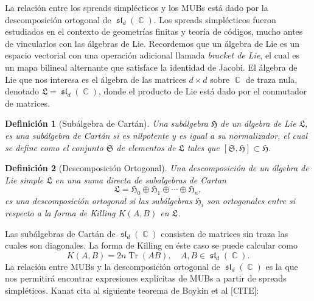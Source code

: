 \documentclass[a4paper]{report}
\DeclareMathOperator{\C}{\mathbb{C}}
\DeclareMathOperator{\Tr}{Tr}
\DeclareMathOperator{\Sl}{\mathfrak{sl}}
\newtheorem{definition}{Definición}
\begin{document}
  La relación entre los spreads simplécticos y los MUBs está
  dado por la descomposición ortogonal de $\Sl_d(\C)$. Los
  spreads simplécticos fueron estudiados en el contexto de
  geometrías finitas y teoría de códigos, mucho antes de
  vincularlos con las álgebras de Lie. Recordemos que un
  álgebra de Lie es un espacio vectorial con una operación
  adicional llamada \textit{bracket de Lie}, el cual es un
  mapa bilineal alternante que satisface la identidad de
  Jacobi. El álgebra de Lie que nos interesa es el álgebra
  de las matrices $d \times d$ sobre $\C$ de traza nula,
  denotado $\mathfrak{L} = \Sl_d(\C)$, donde el producto de
  Lie está dado por el conmutador de matrices.

  \begin{definition}[Subálgebra de Cartán]
    Una subálgebra $\mathfrak{H}$ de un álgebra de Lie
    $\mathfrak{L}$, es una subálgebra de Cartán si es
    nilpotente y es igual a su normalizador, el cual se
    define como el conjunto $\mathfrak{S}$ de elementos de
    $\mathfrak{L}$ tales que $[\mathfrak{S}, \mathfrak{H}]
    \subset \mathfrak{H}$.
  \end{definition}

  \begin{definition}[Descomposición Ortogonal]
    Una descomposición de un álgebra de Lie simple
    $\mathfrak{L}$ en una suma directa de subalgebras de
    Cartan
    \begin{equation}
      \mathfrak{L}
      = \mathfrak{H}_0 \oplus \mathfrak{H}_1 \oplus \cdots
      \oplus \mathfrak{H}_n,
    \end{equation}
    es una descomposición ortogonal si las subálgebras
    $\mathfrak{H}_i$ son ortogonales entre si respecto a la
    forma de Killing $K(A,B)$ en $\mathfrak{L}$.
  \end{definition}

  Las subálgebras de Cartán de $\Sl_d(\C)$ consisten de
  matrices sin traza las cuales son diagonales.  La forma de
  Killing en éste caso se puede calcular como
  \begin{equation}
    K(A,B)
    = 2n \Tr(AB),
    \quad A,B \in \Sl_d(\C).
  \end{equation}
  La relación entre MUBs y la descomposición ortogonal de
  $\Sl_d(\C)$ es la que nos permitirá encontrar expresiones
  explícitas de MUBs a partir de spreads simpléticos. Kanat
  cita al siguiente teorema de Boykin et al [CITE]:
\end{document}
